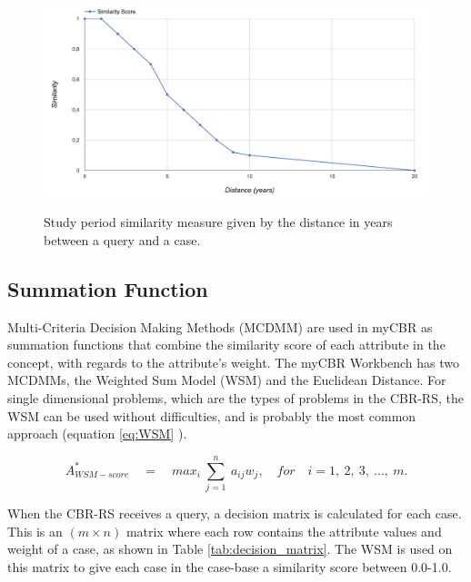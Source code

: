 \begin{figure}[h]
    \centering
    \caption[Study period similarity measure]{Study period similarity measure given by the distance in years between a query and a case.}
    \includegraphics[width=1.0\textwidth]{fig/study_period_graph.png}
    \label{fig:study_period_graph}
\end{figure}

\subsection{Summation Function}

Multi-Criteria Decision Making Methods (MCDMM) are used in myCBR as summation functions that combine the similarity score of each attribute in the concept, with regards to the attribute's weight. The myCBR Workbench has two MCDMMs, the Weighted Sum Model (WSM) and the Euclidean Distance. For single dimensional problems, which are the types of problems in the CBR-RS, the WSM can be used without difficulties, and is probably the most common approach \cite{triantaphyllou2000multi} (equation \ref{eq:WSM} \cite{fishburn1967letter}).

\begin{equation} \label{eq:WSM}
    A^{*}_{WSM-score}\quad =\quad max_{i}\  \sum\limits_{j = 1}^{n}\  a_{ij}w_{j},\quad for \quad i =1,\ 2,\ 3,\ ...,\ m.
\end{equation}

When the CBR-RS receives a query, a decision matrix is calculated for each case. This is an $(m \times n)$ matrix where each row contains the attribute values and weight of a case, as shown in Table \ref{tab:decision_matrix}. The WSM is used on this matrix to give each case in the case-base a similarity score between 0.0-1.0.


